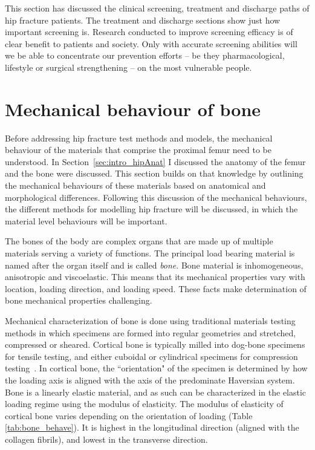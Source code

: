 This section has discussed the clinical screening, treatment and discharge paths of hip fracture patients.
The treatment and discharge sections show just how important screening is.
Research conducted to improve screening efficacy is of clear benefit to patients and society.
Only with accurate screening abilities will we be able to concentrate our prevention efforts -- be they pharmacological, lifestyle or surgical strengthening -- on the most vulnerable people. 

\section{Mechanical behaviour of bone}
\label{sec:intro_boneBehaviour}
Before addressing hip fracture test methods and models, the mechanical behaviour of the materials that comprise the proximal femur need to be understood.
In Section~\ref{sec:intro_hipAnat} I discussed the anatomy of the femur and the bone were discussed.
This section builds on that knowledge by outlining the mechanical behaviours of these materials based on anatomical and morphological differences.
Following this discussion of the mechanical behaviours, the different methods for modelling hip fracture will be discussed, in which the material level behaviours will be important.

The bones of the body are complex organs that are made up of multiple materials serving a variety of functions.
The principal load bearing material is named after the organ itself and is called \textit{bone}.
Bone material is inhomogeneous, anisotropic and viscoelastic.
This means that its mechanical properties vary with location, loading direction, and loading speed.
These facts make determination of bone mechanical properties challenging.

Mechanical characterization of bone is done using traditional materials testing methods in which specimens are formed into regular geometries and stretched, compressed or sheared.
Cortical bone is typically milled into dog-bone specimens for tensile testing, and either cuboidal or cylindrical specimens for compression testing~\citep{currey_effects_1975, reilly_elastic_1975, evans_response_1992}.
In cortical bone, the ``orientation" of the specimen is determined by how the loading axis is aligned with the axis of the predominate Haversian system.
Bone is a linearly elastic material, and as such can be characterized in the elastic loading regime using the modulus of elasticity.
The modulus of elasticity of cortical bone varies depending on the orientation of loading (Table \ref{tab:bone_behave}).
It is highest in the longitudinal direction (aligned with the collagen fibrils), and lowest in the transverse direction.

